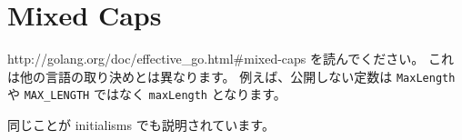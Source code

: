 \section{Mixed Caps}


http:\//\//golang.org\//doc\//effective\_go.html\#mixed-caps を読んでください。 これは他の言語の取り決めとは異なります。 例えば、公開しない定数は \texttt{MaxLength} や \texttt{MAX\_LENGTH} ではなく \texttt{maxLength} となります。

同じことが initialisms でも説明されています。

